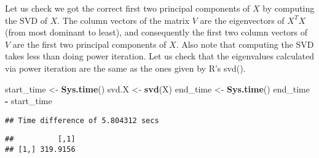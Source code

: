 \documentclass[]{article}
\newenvironment{Shaded}{\begin{snugshade}}{\end{snugshade}}
\newcommand{\CommentTok}[1]{\textcolor[rgb]{0.56,0.35,0.01}{\textit{#1}}}
\newcommand{\KeywordTok}[1]{\textcolor[rgb]{0.13,0.29,0.53}{\textbf{#1}}}
\newcommand{\NormalTok}[1]{#1}
\newcommand{\OperatorTok}[1]{\textcolor[rgb]{0.81,0.36,0.00}{\textbf{#1}}}
\newcommand{\StringTok}[1]{\textcolor[rgb]{0.31,0.60,0.02}{#1}}
\begin{document}
\begin{Shaded}
\end{Shaded}

Let us check we got the correct first two principal components of \(X\)
by computing the SVD of \(X\). The column vectors of the matrix \(V\)
are the eigenvectors of \(X^TX\) (from most dominant to least), and
consequently the first two column vectors of \(V\) are the first two
principal components of \(X\). Also note that computing the SVD takes
less than doing power iteration. Let us check that the eigenvalues
calculated via power iteration are the same as the ones given by R's
svd().

\begin{Shaded}
\begin{Highlighting}[]
\NormalTok{start_time <-}\StringTok{ }\KeywordTok{Sys.time}\NormalTok{()}
\NormalTok{svd.X <-}\StringTok{ }\KeywordTok{svd}\NormalTok{(X)}
\NormalTok{end_time <-}\StringTok{ }\KeywordTok{Sys.time}\NormalTok{() }
\NormalTok{end_time  }\OperatorTok{-}\StringTok{ }\NormalTok{start_time}
\end{Highlighting}
\end{Shaded}

\begin{verbatim}
## Time difference of 5.804312 secs
\end{verbatim}

\begin{Shaded}
\end{Shaded}

\begin{verbatim}
##          [,1]
## [1,] 319.9156
\end{verbatim}

\begin{Shaded}
\end{Shaded}
\end{document}

